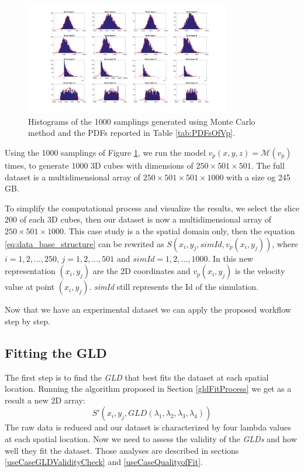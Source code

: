 \begin{figure}[ht]
    \centering
    \includegraphics[width=0.8\textwidth]{images/vp_1000_realizations.png}
    \caption{Histograms of the 1000 samplings generated using Monte Carlo method and the PDFs reported in Table \ref{tab:PDFsOfVp}.}
    \label{fig:vp_1000_realizations}
\end{figure}

Using the 1000 samplings of Figure \ref{fig:vp_1000_realizations}, we run the model $v_{p}(x,y,z) = \mathcal{M}(v_{p})$ times, to generate 1000 3D cubes with dimensions of $250\times501\times501$. The full dataset is a multidimensional array of $250\times501\times501\times1000$ with a size og 245 GB. 

To simplify the computational process and visualize the results, we select the slice 200 of each 3D cubes, then our dataset is now a multidimensional array of $250\times501\times1000$. This case study is a the spatial domain only, then the equation \ref{eq:data_base_structure} can be rewrited as $S(x_{i},y_{j},simId,v_{p}(x_{i},y_{j}))$, where $i=1, 2,...,250$, $j=1, 2,...,501$ and $simId = 1, 2,...,1000$. In this new representation $(x_{i},y_{j})$ are the 2D coordinates and $v_{p}(x_{i},y_{j})$ is the velocity value at point $(x_{i},y_{j})$. \textit{simId} still represents the Id of the simulation.

Now that we have an experimental dataset we can apply the proposed workflow step by step.

\subsection{Fitting the GLD}
The first step is to find the \textit{GLD} that best fits the dataset at each spatial location. Running the algorithm proposed in Section \ref{gldFitProcess} we get as a result a new 2D array:
\begin{equation}\label{eq:gld_fit_2D}
S'(x_{i},y_{j},GLD(\lambda_{1}, \lambda_{2}, \lambda_{3}, \lambda_{4}))
\end{equation}
The raw data is reduced and our dataset is characterized by four lambda values at each spatial location. Now we need to assess the validity of the \textit{GLDs} and how well they fit the dataset. Those analyses are described in sections \ref{useCaseGLDValidityCheck} and \ref{useCaseQualityofFit}. 


